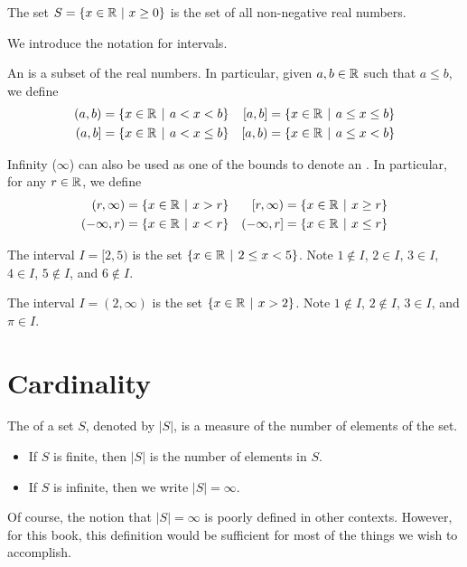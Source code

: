 \begin{example}
    The set $S = \{x \in \mathbb{R} \ | \ x \geq 0 \}$ is the set of all non-negative real numbers.
\end{example}

We introduce the notation for intervals.
\begin{definition}
    An  is a subset of the real numbers. In particular, given $a, b \in \mathbb{R}$ such that $a \leq b$, we define
    \begin{align*}
        (a,b) &= \{x \in \R \vert a < x < b\} & [a,b] &= \{x \in \R \vert a \leq x \leq b\}\\
        (a,b] &= \{x \in \R \vert a < x \leq b\} & [a,b) &= \{x \in \R \vert a \leq x < b\}
    \end{align*}

    Infinity ($\infty$) can also be used as one of the bounds to denote an . In particular, for any $r \in \mathbb{R}$, we define
    \begin{align*}
        (r, \infty) &= \{x \in \R \vert x > r\} & [r, \infty) &= \{x \in \R \vert x \geq r\}\\
        (-\infty,r) &= \{x \in \R \vert x < r\} & (-\infty,r] &= \{x \in \R \vert x \leq r\}
    \end{align*}
\end{definition}

\begin{example}
    The interval $I = [2, 5)$ is the set $\{x \in \R \vert 2 \leq x < 5\}$. Note $1 \notin I$, $2 \in I$, $3 \in I$, $4 \in I$, $5 \notin I$, and $6 \notin I$.
\end{example}

\begin{example}
    The interval $I = (2, \infty)$ is the set $\{x \in \R \vert x > 2\}$. Note $1 \notin I$, $2 \notin I$, $3 \in I$, and $\pi \in I$.
\end{example}

\section{Cardinality}
\begin{definition}
    The  of a set $S$, denoted by $|S|$, is a measure of the number of elements of the set.
    \begin{itemize}
        \item If $S$ is finite, then $|S|$ is the number of elements in $S$.
        \item If $S$ is infinite, then we write $|S| = \infty$.
    \end{itemize}
\end{definition}
\begin{remark}
    Of course, the notion that $|S| = \infty$ is poorly defined in other contexts. However, for this book, this definition would be sufficient for most of the things we wish to accomplish.
\end{remark}

